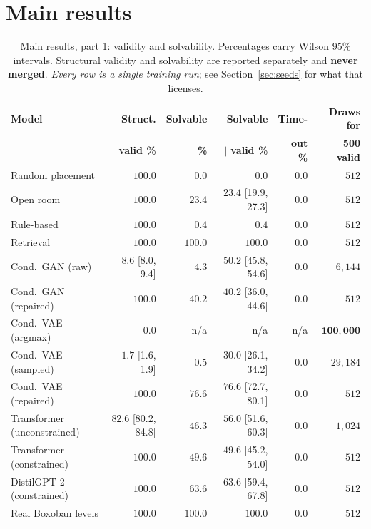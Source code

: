 \documentclass[11pt,a4paper]{report}
\begin{document}
\section{Main results}

\begin{table}[!htb]
\centering\footnotesize
\caption[Main results: validity and solvability]{Main results, part 1:
validity and solvability. Percentages carry Wilson $95\%$ intervals. Structural
validity and solvability are reported separately and \textbf{never merged}.
\emph{Every row is a single training run}; see Section~\ref{sec:seeds} for what
that licenses.}
\label{tab:main1}
\begin{tabular}{@{}l r r r r r@{}}
\toprule
\textbf{Model} & \textbf{Struct.} & \textbf{Solvable} &
\textbf{Solvable} & \textbf{Time-} & \textbf{Draws for} \\
& \textbf{valid \%} & \textbf{\%} & $\mid$ \textbf{valid \%} &
\textbf{out \%} & \textbf{500 valid} \\
\midrule
Random placement & $100.0$ & $0.0$ & $0.0$ & $0.0$ & $512$ \\
Open room & $100.0$ & $23.4$ & $23.4$ {\scriptsize[19.9, 27.3]} & $0.0$ & $512$ \\
Rule-based & $100.0$ & $0.4$ & $0.4$ & $0.0$ & $512$ \\
Retrieval & $100.0$ & $100.0$ & $100.0$ & $0.0$ & $512$ \\
\midrule
Cond.\ GAN (raw) & $8.6$ {\scriptsize[8.0, 9.4]} & $4.3$ & $50.2$
  {\scriptsize[45.8, 54.6]} & $0.0$ & $6{,}144$ \\
Cond.\ GAN (repaired) & $100.0$ & $40.2$ & $40.2$ {\scriptsize[36.0, 44.6]} &
  $0.0$ & $512$ \\
Cond.\ VAE (argmax) & $\mathbf{0.0}$ & n/a & n/a & n/a &
  $\mathbf{100{,}000}$ \\
Cond.\ VAE (sampled) & $1.7$ {\scriptsize[1.6, 1.9]} & $0.5$ & $30.0$
  {\scriptsize[26.1, 34.2]} & $0.0$ & $29{,}184$ \\
Cond.\ VAE (repaired) & $100.0$ & $76.6$ & $\mathbf{76.6}$
  {\scriptsize[72.7, 80.1]} & $0.0$ & $512$ \\
\midrule
Transformer (unconstrained) & $\mathbf{82.6}$ {\scriptsize[80.2, 84.8]} &
  $46.3$ & $56.0$ {\scriptsize[51.6, 60.3]} & $0.0$ & $1{,}024$ \\
Transformer (constrained) & $100.0$ & $49.6$ & $49.6$
  {\scriptsize[45.2, 54.0]} & $0.0$ & $512$ \\
DistilGPT-2 (constrained) & $100.0$ & $63.6$ & $63.6$
  {\scriptsize[59.4, 67.8]} & $0.0$ & $512$ \\
\midrule
Real Boxoban levels & $100.0$ & $100.0$ & $100.0$ & $0.0$ & $512$ \\
\bottomrule
\end{tabular}
\end{table}
\end{document}
